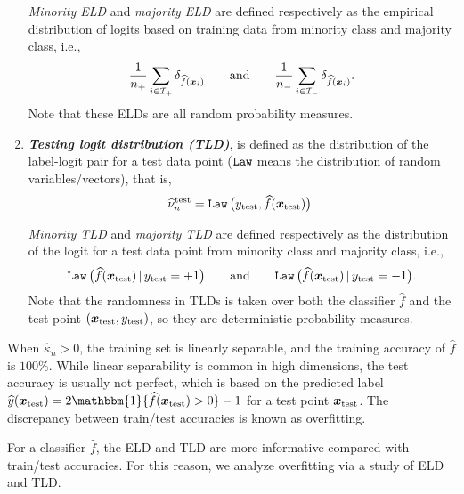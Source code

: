 \begin{defn}
\begin{enumerate}
\emph{Minority ELD} and \emph{majority ELD} are defined respectively as the empirical distribution of logits based on training data from minority class and majority class, i.e.,
\begin{equation*}
    \frac{1}{n_+} \sum_{i \in \mathcal{I}_+} \delta_{\widehat f({\boldsymbol{x}}_i)}
    \qquad \text{and}
    \qquad
    \frac{1}{n_-} \sum_{i \in \mathcal{I}_-} \delta_{\widehat f({\boldsymbol{x}}_i)}.
\end{equation*}
Note that these ELDs are all random probability measures.


\item \textbf{\emph{Testing logit distribution (TLD)}}, is defined as the distribution of the label-logit pair for a test data point ($\mathtt{Law}$ means the distribution of random variables/vectors), that is, 
\begin{equation*}
    \widehat\nu^\mathrm{test}_n = \mathtt{Law} \, \bigl (y_\mathrm{test},  \widehat f({\boldsymbol{x}}_\mathrm{test}) \bigr).
\end{equation*}

\emph{Minority TLD} and \emph{majority TLD} are defined respectively as the distribution of the logit for a test data point from minority class and majority class, i.e.,
\begin{equation*}
    \mathtt{Law} \, \bigl ( \widehat f({\boldsymbol{x}}_\mathrm{test}) \,|\, y_\mathrm{test} = +1 \bigr)
    \qquad \text{and}
    \qquad
    \mathtt{Law} \, \bigl ( \widehat f({\boldsymbol{x}}_\mathrm{test}) \,|\, y_\mathrm{test} = -1 \bigr).
\end{equation*}
Note that the randomness in TLDs is taken over both the classifier $\hat f$ and the test point $({\boldsymbol{x}}_\mathrm{test}, y_\mathrm{test})$, so they are deterministic probability measures.
\end{enumerate}
\end{defn}
When $\hat\kappa_n > 0$, the training set is linearly separable, and the training accuracy of $\hat f$ is $100\%$. While linear separability is common in high dimensions, the test accuracy is usually not perfect, which is based on the predicted label $\hat y(\vx_\mathrm{test}) = 2\mathbbm{1} \{\hat f(\vx_\mathrm{test}) > 0\} - 1$ for a test point ${\boldsymbol{x}}_\mathrm{test}$. The discrepancy between train/test accuracies is known as overfitting.

For a classifier $\hat f$, the ELD and TLD are more informative compared with  train/test accuracies. For this reason, we analyze overfitting via a study of ELD and TLD.


